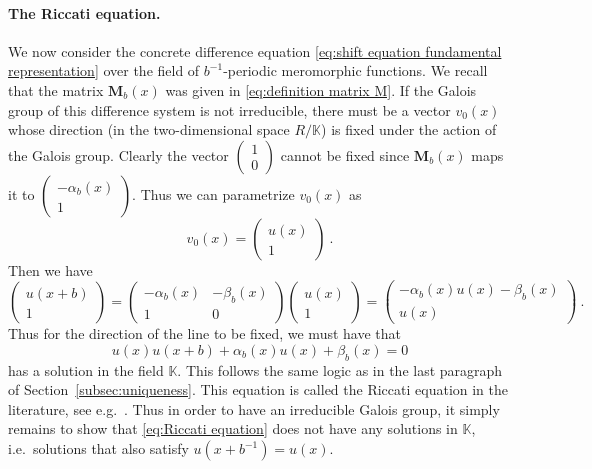 \documentclass[12pt,a4paper]{article}
\newcommand{\be}{\begin{equation}}
\newcommand{\ee}{\end{equation}}
\newcommand\KK{\mathbb{K}}
\begin{document}
\paragraph{The Riccati equation.} We now consider the concrete difference equation \eqref{eq:shift equation fundamental representation}
over the field of $b^{-1}$-periodic meromorphic functions. We recall that the matrix $\mathbf{M}_b(x)$ was given in \eqref{eq:definition matrix M}. If the Galois group of this difference system is not irreducible, there must be a vector $v_0(x)$ whose direction (in the two-dimensional space $R/\KK$) is fixed under the action of the Galois group. Clearly the vector $(\begin{smallmatrix}
    1 \\ 0
\end{smallmatrix})$ cannot be fixed since $\mathbf{M}_b(x)$ maps it to $(\begin{smallmatrix}
    -\alpha_b(x) \\ 1
\end{smallmatrix})$. Thus we can parametrize $v_0(x)$ as
\be 
v_0(x)=\begin{pmatrix}
    u(x) \\ 1
\end{pmatrix}\ .
\ee
Then we have
\be 
\begin{pmatrix}
    u(x+b) \\ 1
\end{pmatrix}=\begin{pmatrix}
    -\alpha_b(x) & -\beta_b(x) \\ 1 & 0
\end{pmatrix} \begin{pmatrix}
    u(x) \\ 1
\end{pmatrix}=\begin{pmatrix}
    -\alpha_b(x) u(x)-\beta_b(x) \\ u(x)
\end{pmatrix}\ .
\ee
Thus for the direction of the line to be fixed, we must have that 
\be 
u(x) u(x+b)+\alpha_b(x) u(x)+\beta_b(x)=0 \label{eq:Riccati equation}
\ee
has a solution in the field $\KK$. This follows the same logic as in the last paragraph of Section~\ref{subsec:uniqueness}. This equation is called the Riccati equation in the literature, see e.g.\ \cite{Van2012Galois}. Thus in order to have an irreducible Galois group, it simply remains to show that \eqref{eq:Riccati equation} does not have any solutions in $\KK$, i.e.\ solutions that also satisfy $u(x+b^{-1})=u(x)$.
\end{document}
